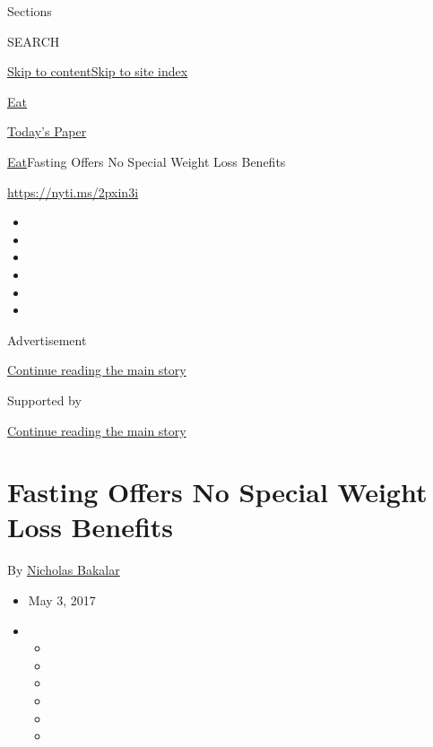 Sections

SEARCH

\protect\hyperlink{site-content}{Skip to
content}\protect\hyperlink{site-index}{Skip to site index}

\href{https://www.nytimes3xbfgragh.onion/section/well/eat}{Eat}

\href{https://myaccount.nytimes3xbfgragh.onion/auth/login?response_type=cookie\&client_id=vi}{}

\href{https://www.nytimes3xbfgragh.onion/section/todayspaper}{Today's
Paper}

\href{/section/well/eat}{Eat}\textbar{}Fasting Offers No Special Weight
Loss Benefits

\url{https://nyti.ms/2pxin3i}

\begin{itemize}
\item
\item
\item
\item
\item
\item
\end{itemize}

Advertisement

\protect\hyperlink{after-top}{Continue reading the main story}

Supported by

\protect\hyperlink{after-sponsor}{Continue reading the main story}

\hypertarget{fasting-offers-no-special-weight-loss-benefits}{%
\section{Fasting Offers No Special Weight Loss
Benefits}\label{fasting-offers-no-special-weight-loss-benefits}}

By
\href{https://www.nytimes3xbfgragh.onion/by/nicholas-bakalar}{Nicholas
Bakalar}

\begin{itemize}
\item
  May 3, 2017
\item
  \begin{itemize}
  \item
  \item
  \item
  \item
  \item
  \item
  \end{itemize}
\end{itemize}

